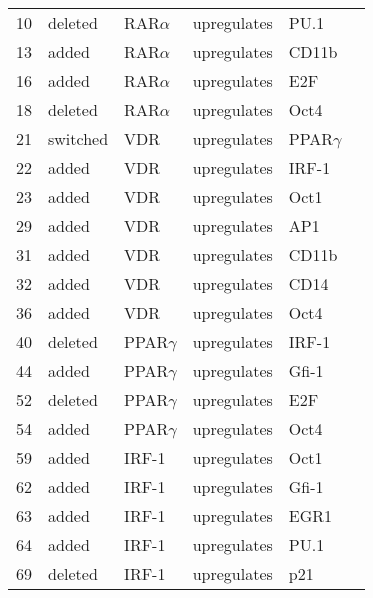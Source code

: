 

\begin{center}
\renewcommand{\arraystretch}{0.8}
\label{HL60+R38_Model}
\begin{scriptsize}
\begin{supertabular}{|p{2 cm}|p{2cm}|p{3cm}|p{2.5cm}|p{2cm}|p{1.5cm}|}  
\hline

10 &  deleted &  RAR$\alpha$   & upregulates &  PU.1 & \\
13 &  added &  RAR$\alpha$   & upregulates &  CD11b & \\
16 &  added &  RAR$\alpha$   & upregulates &  E2F & \\
18 &  deleted &  RAR$\alpha$   & upregulates &  Oct4 & \\
21 &  switched &  VDR  & upregulates &  PPAR$\gamma$ & \\
22 &  added &  VDR  & upregulates &  IRF-1 & \\
23 &  added &  VDR  & upregulates &  Oct1 & \\
29 &  added &  VDR  & upregulates &  AP1 & \cite{Wu2007}\\
31 &  added &  VDR  & upregulates &  CD11b & \\
32 &  added &  VDR  & upregulates &  CD14 & \cite{Sadeghi2006}\\
36 &  added &  VDR  & upregulates &  Oct4 & \\
40 &  deleted &  PPAR$\gamma$  & upregulates &  IRF-1 & \\
44 &  added &  PPAR$\gamma$  & upregulates &  Gfi-1 & \\
52 &  deleted &  PPAR$\gamma$  & upregulates &  E2F & \\
54 &  added &  PPAR$\gamma$  & upregulates &  Oct4 & \\
59 &  added &  IRF-1  & upregulates &  Oct1 & \\
62 &  added &  IRF-1  & upregulates &  Gfi-1 & \\
63 &  added &  IRF-1  & upregulates &  EGR1 & \\
64 &  added &  IRF-1  & upregulates &  PU.1 & \\
69 &  deleted &  IRF-1  & upregulates &  p21 & \\

\end{supertabular}
\end{scriptsize}
\end{center}
